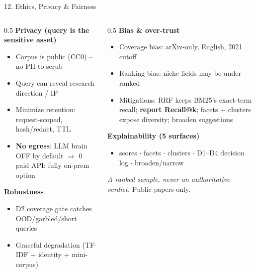 \documentclass[10pt,aspectratio=169]{beamer}
\begin{document}
\begin{frame}{12. Ethics, Privacy \& Fairness}
\begin{columns}[T]
\begin{column}{0.5\textwidth}
\textbf{Privacy (query is the sensitive asset)}
\begin{itemize}\small
  \item Corpus is public (CC0) -- no PII to scrub
  \item Query can reveal research direction / IP
  \item Minimize retention: request-scoped, hash/redact, TTL
  \item \textbf{No egress}: LLM brain OFF by default $\Rightarrow$ 0 paid API; fully on-prem option
\end{itemize}

\textbf{Robustness}
\begin{itemize}\small
  \item D2 coverage gate catches OOD/garbled/short queries
  \item Graceful degradation (TF-IDF + identity + mini-corpus)
\end{itemize}
\end{column}
\begin{column}{0.5\textwidth}
\textbf{Bias \& over-trust}
\begin{itemize}\small
  \item Coverage bias: arXiv-only, English, 2021 cutoff
  \item Ranking bias: niche fields may be under-ranked
  \item Mitigations: RRF keeps BM25's exact-term recall; \textbf{report Recall@k}; facets + clusters expose diversity; broaden suggestions
\end{itemize}

\textbf{Explainability (5 surfaces)}
\begin{itemize}\scriptsize
  \item scores $\cdot$ facets $\cdot$ clusters $\cdot$ D1--D4 decision log $\cdot$ broaden/narrow
\end{itemize}
\scriptsize \emph{A ranked sample, never an authoritative verdict.} Public-papers-only.
\end{column}
\end{columns}
\end{frame}
\end{document}
